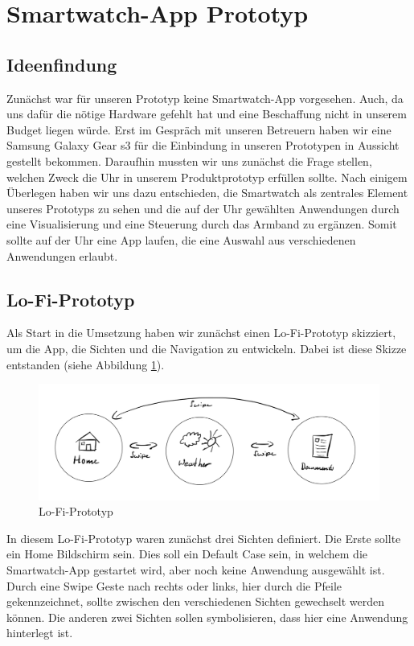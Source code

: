 \documentclass[11pt, a4paper]{article}
\begin{document}
\newpage

\section{Smartwatch-App Prototyp}

\subsection{Ideenfindung}

Zunächst war für unseren Prototyp keine Smartwatch-App vorgesehen. Auch, da uns dafür die nötige Hardware gefehlt hat und eine Beschaffung nicht in unserem Budget liegen würde. Erst im Gespräch mit unseren Betreuern haben wir eine Samsung Galaxy Gear s3 für die Einbindung in unseren Prototypen in Aussicht gestellt bekommen. Daraufhin mussten wir uns zunächst die Frage stellen, welchen Zweck die Uhr in unserem Produktprototyp erfüllen sollte. Nach einigem Überlegen haben wir uns dazu entschieden, die Smartwatch als zentrales Element unseres Prototyps zu sehen und die auf der Uhr gewählten Anwendungen durch eine Visualisierung und eine Steuerung durch das Armband zu ergänzen. Somit sollte auf der Uhr eine App laufen, die eine Auswahl aus verschiedenen Anwendungen erlaubt. 

\subsection{Lo-Fi-Prototyp}

Als Start in die Umsetzung haben wir zunächst einen Lo-Fi-Prototyp skizziert, um die App, die Sichten und die Navigation zu entwickeln. Dabei ist diese Skizze entstanden (siehe Abbildung \ref{fig:Smatwatch_Prototyp}).

\begin{figure}[h]
	\centering
	\includegraphics[scale=.35]{assets/lo_fo_prototyp.jpeg}
	\caption{Lo-Fi-Prototyp}
	\label{fig:Smatwatch_Prototyp}
\end{figure}

In diesem Lo-Fi-Prototyp waren zunächst drei Sichten definiert. Die Erste sollte ein Home Bildschirm sein. Dies soll ein Default Case sein, in welchem die Smartwatch-App gestartet wird, aber noch keine Anwendung ausgewählt ist. Durch eine Swipe Geste nach rechts oder links, hier durch die Pfeile gekennzeichnet, sollte zwischen den verschiedenen Sichten gewechselt werden können. Die anderen zwei Sichten sollen symbolisieren, dass hier eine Anwendung hinterlegt ist. 
\end{document}

